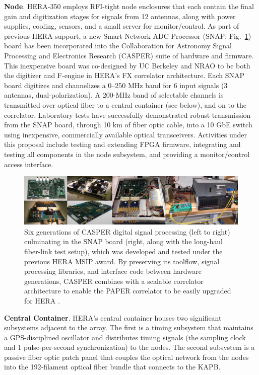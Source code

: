 \documentclass[preprint,11pt]{aastex}
\newcommand{\Mycitep}[1]{\citep{#1}}
\begin{document}
{\bf Node}. HERA-350 employs RFI-tight node enclosures that each contain the final gain and digitization stages for
signals from 12 antennas, along with power supplies, cooling, sensors, and a small server for monitor/control.  
As part of previous HERA support,
a new Smart Network ADC Processor (SNAP; Fig.~\ref{fig:hardware}) board has been incorporated 
into the Collaboration for Astronomy Signal Processing and Electronics Research (CASPER) suite of hardware and firmware. This inexpensive board was co-designed by UC Berkeley and NRAO to be
both the digitizer and F-engine in HERA's FX correlator architecture.
Each SNAP board 
digitizes and channelizes a 0--250 MHz band for 6 input signals (3 antennas, dual-polarization).
A 200-MHz band of selectable channels is transmitted over optical fiber
to a central container (see below), and on to the correlator.  Laboratory
tests have successfully demonstrated robust transmission from the SNAP board, through 10 km of fiber optic cable, 
into a 10 GbE switch using inexpensive, commercially available optical transceivers.
Activities under this proposal include 
testing and extending FPGA firmware,
integrating and testing all components in the node subsystem, and providing a monitor/control
access interface.

\begin{figure}[h]
\centering
\includegraphics[width=1.0\textwidth]{plots/casper_boards.png}
\caption{
Six generations of CASPER digital signal processing (left to right) culminating in the SNAP board (right, along with the long-haul fiber-link test setup), which was developed and tested under the previous HERA MSIP award.
By preserving its toolflow, signal processing libraries, and interface code between hardware generations,
CASPER combines with a scalable correlator architecture to enable the PAPER correlator to be 
easily upgraded for HERA \Mycitep{parsons_et_al2006,parsons_et_al2008}.
%
}\label{fig:hardware}
\end{figure}

{\bf Central Container}.
HERA's central container houses two significant subsystems adjacent to the array.  The first is a timing subsystem
that maintains a GPS-disciplined oscillator and distributes timing
signals (the sampling clock and 1 pulse-per-second synchronization) to the nodes.  The second
subsystem is a passive fiber optic patch panel that couples
the optical network from the nodes into the 192-filament optical fiber bundle 
that connects to the KAPB. 
\end{document}
